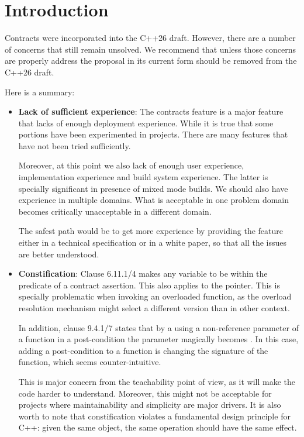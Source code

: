 \section{Introduction}

Contracts were incorporated into the C++26 draft. However, there are a number of
concerns that still remain unsolved. We recommend that unless those concerns are
properly address the proposal in its current form should be removed from the
C++26 draft.

Here is a summary:

\begin{itemize}

\item \textbf{Lack of sufficient experience}: The contracts feature is
a major feature that lacks of enough deployment experience. While it is true
that some portions have been experimented in projects. There are many features
that have not been tried sufficiently.

Moreover, at this point we also lack of enough user experience, implementation
experience and build system experience. The latter is specially significant in
presence of mixed mode builds. We should also have experience in multiple
domains. What is acceptable in one problem domain becomes critically
unacceptable in a different domain.

The safest path would be to get more experience by providing the feature either
in a technical specification or in a white paper, so that all the issues are
better understood.

\item \textbf{Constification}: Clause 6.11.1/4 makes any variable to be
 within the predicate of a contract assertion. This also applies
to the  pointer. This is specially problematic when invoking an
overloaded function, as the overload resolution mechanism might select a
different version than in other context.

In addition, clause 9.4.1/7 states that by a using a non-reference parameter of
a function in a post-condition the parameter magically becomes .
In this case, adding a post-condition to a function is changing the signature of
the function, which seems counter-intuitive.

This is major concern from the teachability point of view, as it will make the
code harder to understand. Moreover, this might not be acceptable for projects
where maintainability and simplicity are major drivers. It is also worth to
note that constification violates a fundamental design principle for C++: given
the same object, the same operation should have the same effect.


\end{itemize}
